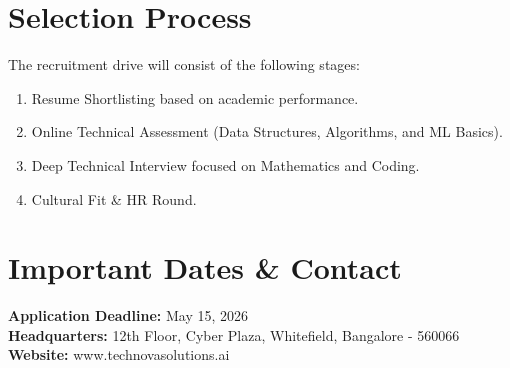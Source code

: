 \documentclass[a4paper,11pt]{article}
\begin{document}
\vspace{5mm}

\section{Selection Process}
The recruitment drive will consist of the following stages:
\begin{enumerate}[noitemsep]
    \item Resume Shortlisting based on academic performance.
    \item Online Technical Assessment (Data Structures, Algorithms, and ML Basics).
    \item Deep Technical Interview focused on Mathematics and Coding.
    \item Cultural Fit \& HR Round.
\end{enumerate}

\vspace{5mm}

\section{Important Dates \& Contact}
\textbf{Application Deadline:} May 15, 2026 \\
\textbf{Headquarters:} 12th Floor, Cyber Plaza, Whitefield, Bangalore - 560066 \\
\textbf{Website:} www.technovasolutions.ai
\end{document}
